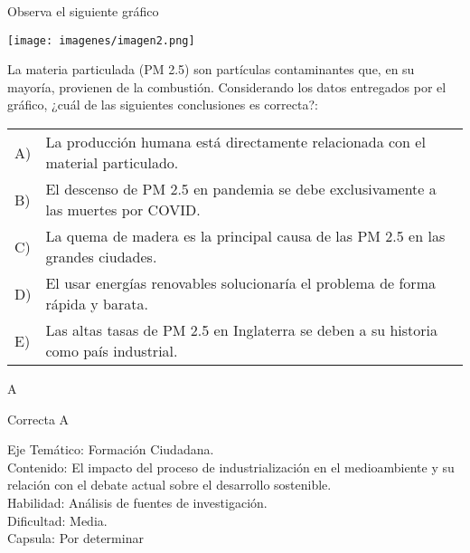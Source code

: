 \documentclass[letterpaper,11pt]{article}
\newcommand{\anchopregunta}{0.9\textwidth}
\begin{document}
\begin{enumerate}
\begin{minipage}{\anchopregunta}
\item Observa el siguiente gráfico
\begin{center}
    \texttt{[image: imagenes/imagen2.png]}
\end{center}
La materia particulada (PM 2.5) son partículas contaminantes que, en su mayoría, provienen de la combustión. Considerando los datos entregados por el gráfico, ¿cuál de las siguientes conclusiones es correcta?:
\begin{flushleft}\begin{tabular}{@{\hspace{-.001\textwidth}}l@{\hspace{2pt}}p{}}
A)& La producción humana está directamente relacionada con el material particulado.\\
B)& El descenso de PM 2.5 en pandemia se debe exclusivamente a las muertes por COVID.\\
C)& La quema de madera es la principal causa de las PM 2.5 en las grandes ciudades.\\
D)& El usar energías renovables solucionaría el problema de forma rápida y barata.\\
E)& Las altas tasas de PM 2.5 en Inglaterra se deben a su historia como país industrial.\\ 
\end{tabular}\end{flushleft}%
\begin{key} A
\end{key} 
\begin{hint}
\end{hint}
\begin{answer} Correcta A \\
\end{answer}
\begin{info} %
\begin{flushleft}
Eje Temático: Formación Ciudadana.\\
Contenido: El impacto del proceso de industrialización en el medioambiente y su relación con el debate actual sobre el desarrollo sostenible.\\
Habilidad: Análisis de fuentes de investigación.\\
Dificultad: Media.\\
Capsula: Por determinar \\
\end{flushleft} 
\end{info}
\end{minipage}\vfill$\;$ %


\end{enumerate}
\end{document}
